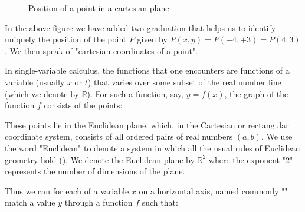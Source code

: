 \begin{figure}[H]
		\vspace*{3mm}
		\caption{Position of a point in a cartesian plane}
	\end{figure}
	In the above figure we have added two graduation that helps us to identify uniquely the position of the point $P$ given by $P(x,y)=P(+4,+3)=P(4,3)$. We then speak of "cartesian coordinates of a point".

	In single-variable calculus, the functions that one encounters are functions of a variable (usually $x$ or $t$) that varies over some subset of the real number line (which we denote by $\mathbb{R}$). For such a function, say, $y = f (x)$, the graph of the function $f$ consists of the points:
	
	These points lie in the Euclidean plane, which, in the Cartesian or rectangular
coordinate system, consists of all ordered pairs of real numbers $(a,b)$. We use the word "Euclidean" to denote a system in which all the usual rules of Euclidean geometry hold (). We denote the Euclidean plane by $\mathbb{R}^2$ where the exponent "$2$" represents the number of dimensions of the plane.

	Thus we can for each of a variable $x$ on a horizontal axis, named commonly "" match a value $y$ through a function $f$ such that:
	
